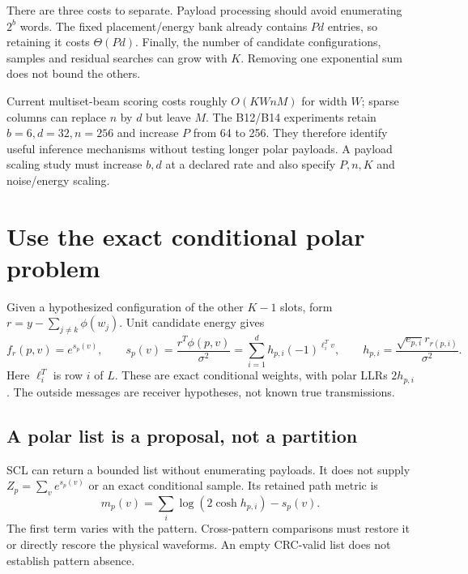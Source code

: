 \documentclass[10pt,a4paper]{article}
\begin{document}
There are three costs to separate. Payload processing should avoid enumerating $2^b$ words. The fixed
placement/energy bank already contains $Pd$ entries, so retaining it costs $\Theta(Pd)$. Finally, the
number of candidate configurations, samples and residual searches can grow with $K$. Removing one
exponential sum does not bound the others.

Current multiset-beam scoring costs roughly $O(KWnM)$ for width $W$; sparse columns can replace $n$ by
$d$ but leave $M$. The B12/B14 experiments retain $b=6,d=32,n=256$ and increase $P$ from 64 to 256.
They therefore identify useful inference mechanisms without testing longer polar payloads. A payload
scaling study must increase $b,d$ at a declared rate and also specify $P,n,K$ and noise/energy scaling.

\section{Use the exact conditional polar problem}
Given a hypothesized configuration of the other $K-1$ slots, form
$r=y-\sum_{j\ne k}\phi(w_j)$. Unit candidate energy gives
\begin{equation}
 f_r(p,v)=e^{s_p(v)},\qquad
 s_p(v)=\frac{r^T\phi(p,v)}{\sigma^2}
       =\sum_{i=1}^d h_{p,i}(-1)^{\ell_i^Tv},\qquad
 h_{p,i}=\frac{\sqrt{e_{p,i}}r_{r(p,i)}}{\sigma^2}.
 \label{eq:score}
\end{equation}
Here $\ell_i^T$ is row $i$ of $L$. These are exact conditional weights, with polar LLRs $2h_{p,i}$.
The outside messages are receiver hypotheses, not known true transmissions.

\subsection{A polar list is a proposal, not a partition}
SCL can return a bounded list without enumerating payloads. It does not supply
$Z_p=\sum_v e^{s_p(v)}$ or an exact conditional sample. Its retained path metric is
\[
 m_p(v)=\sum_i\log(2\cosh h_{p,i})-s_p(v).
\]
The first term varies with the pattern. Cross-pattern comparisons must restore it or directly rescore
the physical waveforms. An empty CRC-valid list does not establish pattern absence.
\end{document}
